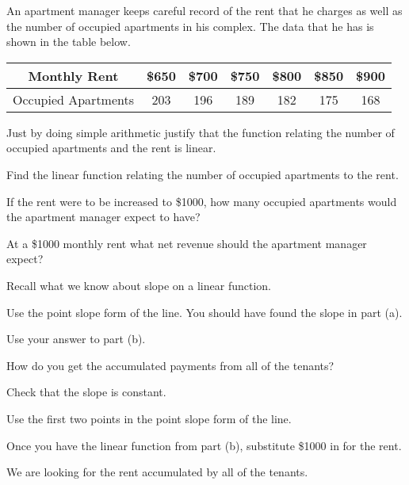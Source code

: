 \begin{activity}\label{A:0.1.3}
An apartment manager keeps careful record of the rent that he charges as well as the
number of occupied apartments in his complex.  The data that he has is shown in the table
below.  
\begin{center}
    \begin{tabular}{|c||c|c|c|c|c|c|}
        \hline
        Monthly Rent & \$650 & \$700 & \$750 & \$800 & \$850 & \$900 \\
        \hline
        Occupied Apartments & 203 & 196 & 189 & 182 & 175 & 168 \\ \hline
    \end{tabular}
\end{center}

\ba 
\item Just by doing simple arithmetic justify that the function relating the number of occupied
    apartments and the rent is linear.
\item Find the linear function relating the number of occupied apartments to the rent.
\item If the rent were to be increased to \$1000, how many occupied apartments would the
    apartment manager expect to have?
\item At a \$1000 monthly rent what net revenue should the apartment manager expect?
\ea
\end{activity}
\begin{smallhint}
   \ba
        \item Recall what we know about slope on a linear function.
        \item Use the point slope form of the line.  You should have found the slope in
            part (a).
        \item Use your answer to part (b).
        \item How do you get the accumulated payments from all of the tenants?
   \ea
\end{smallhint}
\begin{bighint}
   \ba
        \item Check that the slope is constant.
        \item Use the first two points in the point slope form of the line.
        \item Once you have the linear function from part (b), substitute \$1000 in for
            the rent.
        \item We are looking for the rent accumulated by all of the tenants.
   \ea
\end{bighint}

